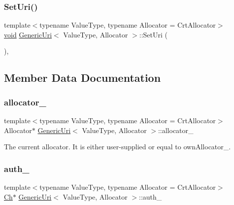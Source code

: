 \subsubsection{\texorpdfstring{Set\+Uri()}{SetUri()}}
{\footnotesize\ttfamily template$<$typename Value\+Type, typename Allocator = Crt\+Allocator$>$ \\
\hyperlink{imgui__impl__opengl3__loader_8h_ac668e7cffd9e2e9cfee428b9b2f34fa7}{void} \hyperlink{classGenericUri}{Generic\+Uri}$<$ Value\+Type, Allocator $>$\+::Set\+Uri (\begin{DoxyParamCaption}{ }\end{DoxyParamCaption})\hspace{0.3cm}{\ttfamily [inline]}, {\ttfamily [private]}}



\subsection{Member Data Documentation}
\mbox{\label{classGenericUri_a7dfc227fe6ffd380d4f9f69dc7ecc3b1}} 
\subsubsection{\texorpdfstring{allocator\+\_\+}{allocator\_}}
{\footnotesize\ttfamily template$<$typename Value\+Type, typename Allocator = Crt\+Allocator$>$ \\
Allocator$\ast$ \hyperlink{classGenericUri}{Generic\+Uri}$<$ Value\+Type, Allocator $>$\+::allocator\+\_\+\hspace{0.3cm}{\ttfamily [private]}}



The current allocator. It is either user-\/supplied or equal to own\+Allocator\+\_\+. 

\mbox{\label{classGenericUri_a639baa36906d6b2b8fe035e225fc2723}} 
\subsubsection{\texorpdfstring{auth\+\_\+}{auth\_}}
{\footnotesize\ttfamily template$<$typename Value\+Type, typename Allocator = Crt\+Allocator$>$ \\
\hyperlink{classGenericUri_a20d0602cff62211d89bc4b25963beeee}{Ch}$\ast$ \hyperlink{classGenericUri}{Generic\+Uri}$<$ Value\+Type, Allocator $>$\+::auth\+\_\+\hspace{0.3cm}{\ttfamily [private]}}

